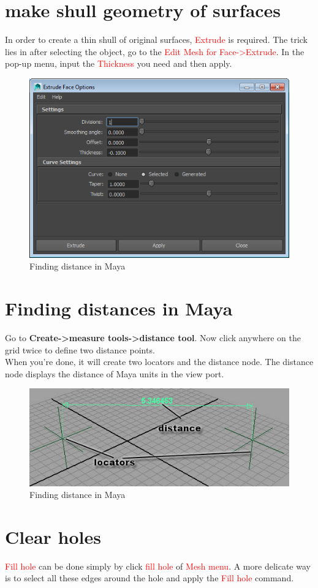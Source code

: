 \section{make shull geometry of surfaces}
In order to create a thin shull of original surfaces, \textcolor{red}{Extrude} is required. The trick lies in after selecting the object, go to the \textcolor{red}{Edit Mesh for Face-\textgreater Extrude}. In the pop-up menu, input the \textcolor{red}{Thickness} you need and then apply.

\begin{figure}[tbh]
	\centering
	\includegraphics[width=0.5\linewidth]{"figures/Making shull by Extrude"}
	\caption{Finding distance in Maya}
	\label{fig:Making shell by Extrude}
\end{figure}

\section{Finding distances in Maya}
Go to \textbf{Create-\textgreater measure tools-\textgreater distance tool}. Now click anywhere on the grid twice to define two distance points.\\

When you're done, it will create two locators and the distance node. The distance node displays the distance of Maya units in the view port.

\begin{figure}[tbh]
	\centering
	\includegraphics[width=0.5\linewidth]{"figures/Finding distances in maya"}
	\caption{Finding distance in Maya}
	\label{fig:Finding distances in maya}
\end{figure}

\section{Clear holes}
\textcolor{red}{Fill hole} can be done simply by click \textcolor{red}{fill hole} of \textcolor{red}{Mesh menu}. A more delicate way is to select all these edges around the hole and apply the \textcolor{red}{Fill hole} command.

